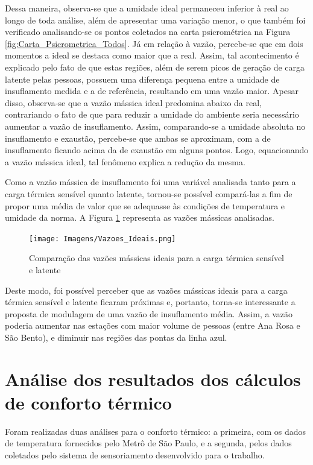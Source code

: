 \documentclass[acronym,symbols,table]{fei}
\begin{document}
Dessa maneira, observa-se que a umidade ideal permaneceu inferior à real ao longo de toda análise, além de apresentar uma variação menor, o que também foi verificado analisando-se os pontos coletados na carta psicrométrica na Figura \ref{fig:Carta_Psicrometrica_Todos}. Já em relação à vazão, percebe-se que em dois momentos a ideal se destaca como maior que a real. Assim, tal acontecimento é explicado pelo fato de que estas regiões, além de serem picos de geração de carga latente pelas pessoas, possuem uma diferença pequena entre a umidade de insuflamento medida e a de referência, resultando em uma vazão maior. Apesar disso, observa-se que a vazão mássica ideal predomina abaixo da real, contrariando o fato de que para reduzir a umidade do ambiente seria necessário aumentar a vazão de insuflamento. Assim, comparando-se a umidade absoluta no insuflamento e exaustão, percebe-se que ambas se aproximam, com a de insuflamento ficando acima da de exaustão em alguns pontos. Logo, equacionando a vazão mássica ideal, tal fenômeno explica a redução da mesma.     

Como a vazão mássica de insuflamento foi uma variável analisada tanto para a carga térmica sensível quanto latente, tornou-se possível compará-las a fim de propor uma média de valor que se adequasse às condições de temperatura e umidade da norma. A Figura \ref{fig:Vazoes_Ideais} representa as vazões mássicas analisadas.

\begin{figure}[!htb]
    \centering
    \caption{Comparação das vazões mássicas ideais para a carga térmica sensível e latente}
    \texttt{[image: Imagens/Vazoes\_Ideais.png]}
    \label{fig:Vazoes_Ideais}
\end{figure}
\newpage
Deste modo, foi possível perceber que as vazões mássicas ideais para a carga térmica sensível e latente ficaram próximas e, portanto, torna-se interessante a proposta de modulagem de uma vazão de insuflamento média. Assim, a vazão poderia aumentar nas estações com maior volume de pessoas (entre Ana Rosa e São Bento), e diminuir nas regiões das pontas da linha azul.
 
\section{Análise dos resultados dos cálculos de conforto térmico} \label{termico}

Foram realizadas duas análises para o conforto térmico: a primeira, com os dados de temperatura fornecidos pelo Metrô de São Paulo, e a segunda, pelos dados coletados pelo sistema de sensoriamento desenvolvido para o trabalho. 
\end{document}

